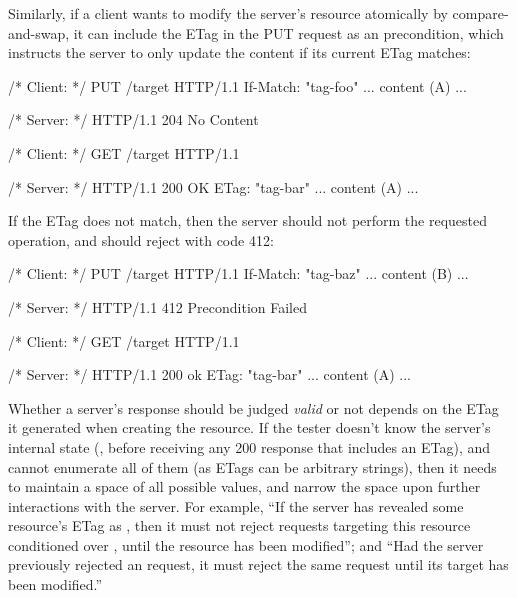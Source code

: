 Similarly, if a client wants to modify the server's resource atomically by
compare-and-swap, it can include the ETag in the PUT request as an
 precondition, which instructs the server to only update the
content if its current ETag matches:
\begin{multicols}{2}
\begin{cpp}
  /* Client: */
  PUT /target HTTP/1.1
  If-Match: "tag-foo"
  ... content (A) ...
\end{cpp}
\columnbreak
\begin{cpp}
  /* Server: */
  HTTP/1.1 204 No Content
\end{cpp}
\end{multicols}
\begin{multicols}{2}
\begin{cpp}
  /* Client: */
  GET /target HTTP/1.1
\end{cpp}
\columnbreak
\begin{cpp}
  /* Server: */
  HTTP/1.1 200 OK
  ETag: "tag-bar"
  ... content (A) ...
\end{cpp}
\end{multicols}
If the ETag does not match, then the server should not perform the requested
operation, and should reject with code 412:
\begin{multicols}{2}
\begin{cpp}
  /* Client: */
  PUT /target HTTP/1.1
  If-Match: "tag-baz"
  ... content (B) ...
\end{cpp}
\columnbreak
\begin{cpp}
  /* Server: */
  HTTP/1.1 412 Precondition Failed
\end{cpp}
\end{multicols}

\begin{multicols}{2}
\begin{cpp}
  /* Client: */
  GET /target HTTP/1.1
\end{cpp}
\columnbreak
\begin{cpp}
  /* Server: */
  HTTP/1.1 200 ok
  ETag: "tag-bar"
  ... content (A) ...
\end{cpp}
\end{multicols}
Whether a server's response should be judged {\em valid} or not depends on the
ETag it generated when creating the resource.  If the tester doesn't know the
server's internal state (\eg, before receiving any 200 response that
includes an ETag), and cannot enumerate all of them (as ETags can be arbitrary
strings), then it needs to maintain a space of all possible values, and narrow
the space upon further interactions with the server.  For example, ``If the
server has revealed some resource's ETag as , then it must
not reject requests targeting this resource conditioned over , until the resource has been modified''; and ``Had the server
previously rejected an  request, it must reject the same
request until its target has been modified.''

